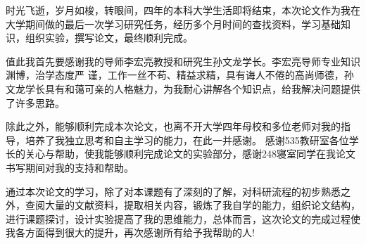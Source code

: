 
时光飞逝，岁月如梭，转眼间，四年的本科大学生活即将结束，本次论文作为我在大学期间做的最后一次学习研究任务，经历多个月时间的查找资料，学习基础知识，组织实验，撰写论文，最终顺利完成。

值此我首先要感谢我的导师李宏亮教授和研究生孙文龙学长。李宏亮导师专业知识渊博，治学态度严
谨，工作一丝不苟、精益求精，具有诲人不倦的高尚师德，孙文龙学长具有和蔼可亲的人格魅力，为我耐心讲解各个知识点，给我解决问题提供了许多思路。

除此之外，能够顺利完成本次论文，也离不开大学四年母校和多位老师对我的指导，培养了我独立思考和自主学习的能力，在此一并感谢。
感谢535教研室各位学长的关心与帮助，使我能够顺利完成论文的实验部分，感谢248寝室同学在我论文书写期间对我的支持和帮助。

通过本次论文的学习，除了对本课题有了深刻的了解，对科研流程的初步熟悉之外，查阅大量的文献资料，提取相关内容，锻炼了我自学的能力，组织论文结构，进行课题探讨，设计实验提高了我的思维能力，总体而言，这次论文的完成过程使我各方面得到很大的提升，再次感谢所有给予我帮助的人!
